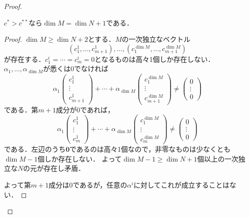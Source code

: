 \begin{proof}
  \begin{lem}
    \(c^*>c^{**}\)なら\(\dim M = \dim N + 1\)である．
  \end{lem}
  \begin{proof}
    \(\dim M \geq \dim N+2\)とする．\(M\)の一次独立なベクトル
    \[ (c^1_1 , \ldots, c^1_{m+1}) , \ldots, (c^{\dim M}_1 , \ldots, c^{\dim M}_{m+1}) \]
    が存在する．\(c^i_1=\cdots=c^i_m=0\)となるものは高々1個しか存在しない．
    \(\alpha_1, \ldots, \alpha_{\dim M}\)が悉くは\(0\)でなければ
    \[
    \alpha_1
    \begin{pmatrix}
      c^1_1 \\ \vdots \\ c^1_{m+1}
    \end{pmatrix}
    + \cdots +
    \alpha_{\dim M}
    \begin{pmatrix}
      c^{\dim M}_1 \\ \vdots \\ c^{\dim M}_{m+1}
    \end{pmatrix}
    \neq
    \begin{pmatrix}
      0 \\ \vdots \\ 0
    \end{pmatrix}
    \]
    である．第\(m+1\)成分が\(0\)であれば，
    \[
    \alpha_1
    \begin{pmatrix}
      c^1_1 \\ \vdots \\ c^1_m
    \end{pmatrix}
    + \cdots +
    \alpha_{\dim M}
    \begin{pmatrix}
      c^{\dim M}_1 \\ \vdots \\ c^{\dim M}_m
    \end{pmatrix}
    \neq
    \begin{pmatrix}
      0 \\ \vdots \\ 0
    \end{pmatrix}
    \]
    である．左辺のうち\(\boldsymbol{0}\)であるのは高々1個なので，非零なものは少なくとも\(\dim M-1\)個しか存在しない．
    よって\(\dim M-1\geq\dim N+1\)個以上の一次独立な\(N\)の元が存在し矛盾．

    よって第\(m+1\)成分は\(0\)であるが，任意の\(\alpha^i\)に対してこれが成立することはない．
  \end{proof}


\end{proof}
